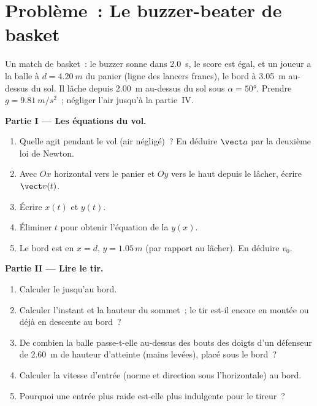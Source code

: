 \section{Problème~: Le buzzer-beater de basket}

\begin{problem}
\label{pb:g12:projectile-motion:1}
Un match de basket~: le buzzer sonne dans \qty{2.0}{s}, le score est
égal, et un joueur a la balle à $d = \qty{4.20}{m}$ du panier
(ligne des lancers francs), le bord à \qty{3.05}{m} au-dessus du sol.
Il lâche depuis \qty{2.00}{m} au-dessus du sol sous $\alpha = \ang{50}$.
Prendre $g = \qty{9.81}{m/s^2}$~; négliger l'air jusqu'à la partie~IV.

\medskip
\noindent\textbf{Partie I --- Les équations du vol.}
\begin{enumerate}
  \item Quelle  agit pendant le vol (air négligé)~? En
        déduire $\vect a$ par la deuxième loi de Newton.
  \item Avec $Ox$ horizontal vers le panier et $Oy$ vers le haut
        depuis le lâcher, écrire $\vect v(t)$.
  \item Écrire $x(t)$ et $y(t)$.
  \item Éliminer $t$ pour obtenir l'équation de la
         $y(x)$.
  \item Le bord est en $x = d$, $y = 1.05\,\unit{m}$ (par rapport au
        lâcher). En déduire $v_0$.
\end{enumerate}

\medskip
\noindent\textbf{Partie II --- Lire le tir.}
\begin{enumerate}[resume]
  \item Calculer le  jusqu'au bord.
  \item Calculer l'instant et la hauteur du sommet~; le tir est-il
        encore en montée ou déjà en descente au bord~?
  \item De combien la balle passe-t-elle au-dessus des bouts des doigts
        d'un défenseur de \qty{2.60}{m} de hauteur d'atteinte (mains
        levées), placé sous le bord~?
  \item Calculer la vitesse d'entrée (norme et direction sous
        l'horizontale) au bord.
  \item Pourquoi une entrée plus raide est-elle plus indulgente pour le
        tireur~?
\end{enumerate}


\end{problem}
